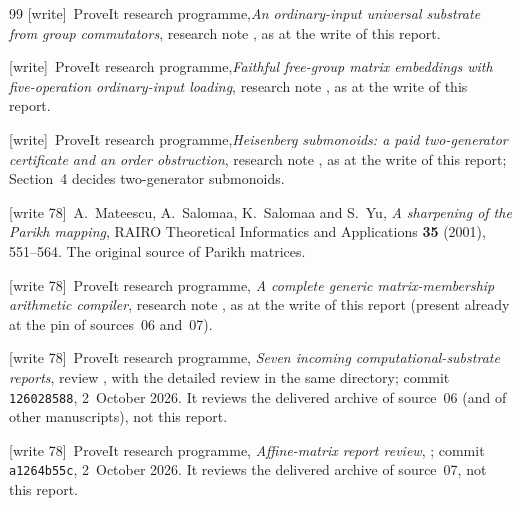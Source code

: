 \documentclass[11pt,letterpaper]{article}
\theoremstyle{definition}
\theoremstyle{remark}
\newcommand{\wtag}{\textup{[write]}}
\newcommand{\wtagb}{\textup{[write 78]}}
\begin{document}
\begin{thebibliography}{99}
\wtag\ ProveIt research programme,\emph{An ordinary-input universal substrate from group commutators}, research note , as at the write of this report.

\wtag\ ProveIt research programme,\emph{Faithful free-group matrix embeddings with five-operation ordinary-input loading}, research note , as at the write of this report.

\wtag\ ProveIt research programme,\emph{Heisenberg submonoids: a paid two-generator certificate and an order obstruction}, research note , as at the write of this report; Section~4 decides two-generator submonoids.


\wtagb\ A.~Mateescu, A.~Salomaa, K.~Salomaa and S.~Yu, \emph{A sharpening of the Parikh mapping}, RAIRO Theoretical Informatics and Applications \textbf{35} (2001), 551--564. The original source of Parikh matrices.

\wtagb\ ProveIt research programme, \emph{A complete generic matrix-membership arithmetic compiler}, research note , as at the write of this report (present already at the pin of sources~06 and~07).

\wtagb\ ProveIt research programme, \emph{Seven incoming computational-substrate reports}, review , with the detailed review  in the same directory; commit \texttt{126028588}, 2~October 2026. It reviews the delivered archive of source~06 (and of other manuscripts), not this report.

\wtagb\ ProveIt research programme, \emph{Affine-matrix report review}, ; commit \texttt{a1264b55c}, 2~October 2026. It reviews the delivered archive of source~07, not this report.


\end{thebibliography}
\end{document}

